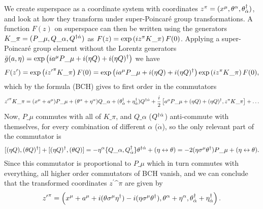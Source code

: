 \documentclass[../main.tex]{subfiles}
\begin{document}
We create superspace as a coordinate system with coordinates \(z\^{\pi} = (x\^{\mu}, \theta\^{\alpha}, \theta\indices*{^\dagger_{\dot\alpha}})\), and look at how they transform under super-Poincaré group transformations.
A function \(F(z)\) on superspace can then be written using the generators \(K\_\pi = (P\_\mu, Q\_\alpha, Q\indices*{^\dagger^{\dot\alpha}})\) as \(F(z) = \exptext{iz\^\pi K\_\pi} F(0)\).
Applying a super-Poincaré group element without the Lorentz generators \(\bar{g}(a, \eta) = \exptext{ia\^\mu P\_\mu + i (\eta Q) + i (\eta Q)^\dagger}\) we have
\begin{equation}
  F(z^\prime) = \exptext{i{z^\prime}\^\pi K\_\pi} F(0) = \exptext{ia\^\mu P\_\mu + i (\eta Q) + i (\eta Q)^\dagger} \exptext{iz\^\pi K\_\pi} F(0),
\end{equation}
which by the  formula (BCH) gives to first order in the commutators
\begin{equation}
  {z^\prime}\^\pi K\_\pi = (x\^\mu + a\^\mu) P\_\mu + (\theta\^\alpha + \eta\^\alpha)Q\_\alpha + (\theta\indices*{^\dagger_{\dot\alpha}} + \eta\indices*{^\dagger_{\dot\alpha}})Q\indices*{^\dagger^{\dot\alpha}} + \frac{i}{2}\bclosed{a\^\mu P\_\mu + (\eta Q) + (\eta Q)^\dagger, z\^\pi K\_\pi} + \ldots
\end{equation}
Now, \(P\_\mu\) commutes with all of \(K\_\pi\), and \(Q\_\alpha\) (\(Q\indices*{^\dagger^{\dot\alpha}}\)) anti-commute with themselves, for every combination of different \(\alpha\) (\(\dot\alpha\)), so the only relevant part of the commutator is
\begin{equation}
  \commutator{(\eta Q)}{(\theta Q)^\dagger} + \commutator{(\eta Q)^\dagger}{(\theta Q)} = -\eta\^\alpha \anticommutator{Q\_\alpha}{Q\indices*{^\dagger_{\dot\alpha}}} \theta\indices*{^\dagger^{\dot\alpha}} + (\eta \leftrightarrow \theta) = -2(\eta \sigma\^\mu \theta^\dagger)P\_\mu + (\eta \leftrightarrow \theta).
\end{equation}
Since this commutator is proportional to \(P\_\mu\) which in turn commutes with everything, all higher order commutators of BCH vanish, and we can conclude that the transformed coordinates \({z^\prime}\^\pi\) are given by
\begin{equation}
  \label{susy:eq:zprime}
  {z^\prime}\^\pi = \pclosed{x\^\mu + a\^\mu + i(\theta \sigma\^\mu \eta^\dagger) - i(\eta \sigma\^\mu \theta^\dagger), \theta\^\alpha + \eta\^\alpha, \theta\indices*{^\dagger_{\dot\alpha}} + \eta\indices*{^\dagger_{\dot\alpha}}}.
\end{equation}
\end{document}
